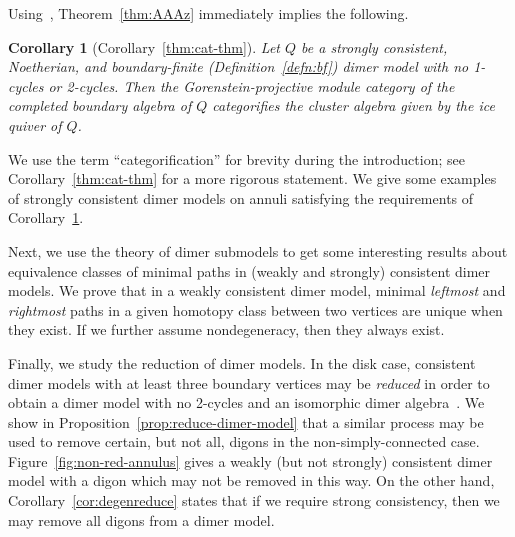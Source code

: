 \documentclass{article}
\newtheorem{conIntro}[thmIntro]{Corollary}    \renewcommand{\thethmIntro}{\Alph{thmIntro}}
\theoremstyle{definition}
\begin{document}
Using~\cite[Theorem 4.1 and Theorem 4.10]{AIRX}, Theorem~\ref{thm:AAAz} immediately implies the following. 
\begin{conIntro}[{Corollary~\ref{thm:cat-thm}}]\label{cor:GFDS}
	Let $Q$ be a strongly consistent, Noetherian, and boundary-finite (Definition~\ref{defn:bf}) dimer model with no 1-cycles or 2-cycles. Then the Gorenstein-projective module category of the completed boundary algebra of $Q$ categorifies the cluster algebra given by the ice quiver of $Q$.
\end{conIntro}
We use the term ``categorification'' for brevity during the introduction; see Corollary~\ref{thm:cat-thm} for a more rigorous statement.
We give some examples of strongly consistent dimer models on annuli satisfying the requirements of Corollary~\ref{cor:GFDS}. 

{Next, we use the theory of dimer submodels to get some interesting results about equivalence classes of minimal paths in (weakly and strongly) consistent dimer models. We prove that in a weakly consistent dimer model, minimal \textit{leftmost} and \textit{rightmost} paths in a given homotopy class between two vertices are unique when they exist. If we further assume nondegeneracy, then they always exist.}

Finally, we study the reduction of dimer models. In the disk case, consistent dimer models with at least three boundary vertices may be \textit{reduced} in order to obtain a dimer model with no 2-cycles and an isomorphic dimer algebra~\cite[\S2]{XPressland2019}. 
We show in Proposition~\ref{prop:reduce-dimer-model} that a similar process may be used to remove certain, but not all, digons in the non-simply-connected case. 
Figure~\ref{fig:non-red-annulus} gives a weakly (but not strongly) consistent dimer model with a digon which may not be removed in this way. 
On the other hand, Corollary~\ref{cor:degenreduce} states that if we require strong consistency, then we may remove all digons from a dimer model.
\end{document}
